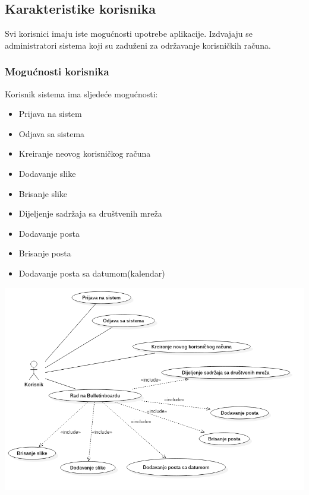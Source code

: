 \subsection{Karakteristike korisnika}
Svi korisnici imaju iste mogućnosti upotrebe aplikacije. Izdvajaju se administratori sistema koji su zaduženi za održavanje korisničkih računa.
\subsubsection{Mogućnosti korisnika}
Korisnik sistema ima sljedeće mogućnosti:
\begin{itemize}
    \item Prijava na sistem
    \item Odjava sa sistema
    \item Kreiranje neovog korisničkog računa
    \item Dodavanje slike
    \item Brisanje slike
    \item Dijeljenje sadržaja sa društvenih mreža
    \item Dodavanje posta
    \item Brisanje posta
    \item Dodavanje posta sa datumom(kalendar)
\end{itemize}
\includegraphics[scale=0.5]{SRS/use_cases/korisnik_use_case.png}

